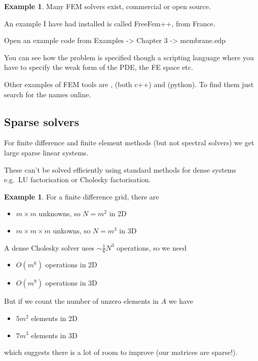 \documentclass[12pt, a4paper]{article}
\theoremstyle{definition}
\newtheorem{example}[thm]{Example}
\theoremstyle{remark}
\numberwithin{equation}{section}
\begin{document}
\begin{example} 
Many FEM solvers exist, commercial or open source. 

An example I have had installed is called FreeFem++, from France. 

Open an example code from Examples -> Chapter 3 -> membrane.edp

You can see how the problem is specified though a scripting language where you have to specify the weak form of the PDE, the FE space etc. 

Other examples of  FEM tools are ,  (both c++) and  (python). To find them just search for the names online.
\end{example}




\newpage
\subsection{Sparse solvers}

For finite difference and finite element methods (but not spectral solvers) we get large sparse linear systems.

These can't be solved efficiently using standard methods for dense systems e.g.\ LU factorisation or Cholesky factorisation.
\begin{example}
For a finite difference grid, there are 
\begin{itemize}
\item $m\times m$ unknowns, so $N=m^2$ in 2D
\item $m \times m \times m$ unkowns, so $N=m^3$ in 3D
\end{itemize}
A dense Cholesky solver uses $\sim \frac{1}{6}N^3$ operations, so we need
\begin{itemize}
\item $O(m^6)$ operations in 2D
\item $O(m^9)$ operations in 3D
\end{itemize}
But if we count the number of unzero elements in $A$ we have
\begin{itemize}
\item $5m^2$ elements in 2D
\item $7m^3$ elements in 3D
\end{itemize}
which suggests there is a lot of room to improve (our matrices are sparse!).
\end{example}
\end{document}
